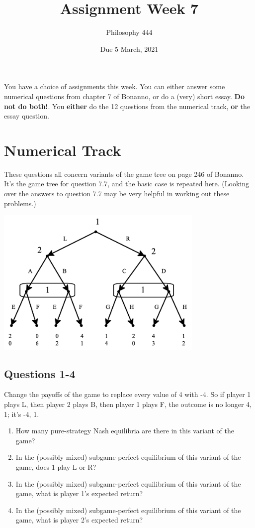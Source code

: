 \documentclass[
  11pt,
]{article}
\title{Assignment Week 7}
\author{Philosophy 444}
\date{Due 5 March, 2021}
\providecommand{\tightlist}{%
  \setlength{\itemsep}{0pt}\setlength{\parskip}{0pt}}
\begin{document}
\maketitle


You have a choice of assignments this week. You can either answer some
numerical questions from chapter 7 of Bonanno, or do a (very) short
essay. \textbf{Do not do both!}. You \textbf{either} do the 12 questions
from the numerical track, \textbf{or} the essay question.

\hypertarget{numerical-track}{%
\section{Numerical Track}\label{numerical-track}}

These questions all concern variants of the game tree on page 246 of
Bonanno. It's the game tree for question 7.7, and the basic case is
repeated here. (Looking over the answers to question 7.7 may be very
helpful in working out these problems.)

\includegraphics[width=0.75\textwidth,height=\textheight]{bonanno-tree.png}

\hypertarget{questions-1-4}{%
\subsection{Questions 1-4}\label{questions-1-4}}

Change the payoffs of the game to replace every value of 4 with -4. So
if player 1 plays L, then player 2 plays B, then player 1 plays F, the
outcome is no longer 4, 1; it's -4, 1.

\begin{enumerate}
\def\labelenumi{\arabic{enumi}.}
\tightlist
\item
  How many pure-strategy Nash equilibria are there in this variant of
  the game?
\item
  In the (possibly mixed) subgame-perfect equilibrium of this variant of
  the game, does 1 play L or R?
\item
  In the (possibly mixed) subgame-perfect equilibrium of this variant of
  the game, what is player 1's expected return?
\item
  In the (possibly mixed) subgame-perfect equilibrium of this variant of
  the game, what is player 2's expected return?
\end{enumerate}
\end{document}
